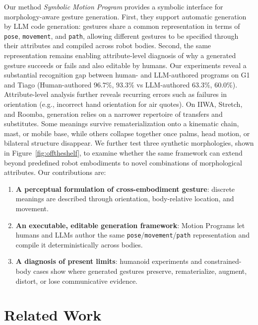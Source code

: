 \documentclass[letterpaper,10pt,conference]{ieeeconf}
\newcommand{\methodfull}{Symbolic Motion Program}
\begin{document}
Our method \textit{\methodfull{}} provides a symbolic interface for morphology-aware gesture generation. First, they support automatic generation by LLM code generation: gestures share a common representation in terms of \texttt{pose}, \texttt{movement}, and \texttt{path}, allowing different gestures to be specified through their attributes and compiled across robot bodies. Second, the same representation remains enabling attribute-level diagnosis of why a generated gesture succeeds or fails and also editable by humans. Our experiments reveal a substantial recognition gap between human- and LLM-authored programs on G1 and Tiago (Human-authored $96.7\%$, $93.3\%$ vs LLM-authored $63.3\%$, $60.0\%$). Attribute-level analysis further reveals recurring errors such as failures in orientation (e.g., incorrect hand orientation for air quotes). On IIWA, Stretch, and Roomba, generation relies on a narrower repertoire of transfers and substitutes. Some meanings survive rematerialization onto a kinematic chain, mast, or mobile base, while others collapse together once palms, head motion, or bilateral structure disappear. We further test three synthetic morphologies, shown in Figure~\ref{fig:offtheshelf}, to examine whether the same framework can extend beyond predefined robot embodiments to novel combinations of morphological attributes. Our contributions are:
\begin{enumerate}
\setlength{\itemsep}{0.1em}
\item \textbf{A perceptual formulation of cross-embodiment gesture}: discrete meanings are described through orientation, body-relative location, and movement.
\item \textbf{An executable, editable generation framework}: Motion Programs let humans and LLMs author the same \texttt{pose}/\texttt{movement}/\texttt{path} representation and compile it deterministically across bodies.
\item \textbf{A diagnosis of present limits}: humanoid experiments and constrained-body cases show where generated gestures preserve, rematerialize, augment, distort, or lose communicative evidence.
\end{enumerate}

\section{Related Work}
\end{document}
